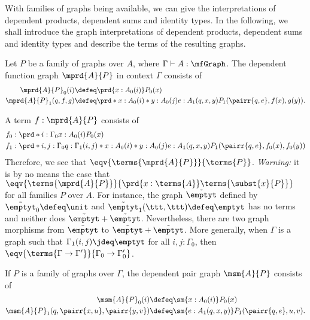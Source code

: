 With families of graphs being available, we can give the interpretations of
dependent products, dependent sums and identity types. In the following, we
shall introduce the graph interpretations of dependent products, dependent
sums and identity types and describe the terms of the resulting graphs.

\begin{defn}
Let $P$ be a family of graphs over $A$, where $\Gamma\vdash A:\mfGraph$. 
The dependent function graph $\mprd{A}{P}$ in context $\Gamma$ consists of
\begin{align*}
\mprd{A}{P}_0(i) & \defeq \prd{x:A_0(i)}P_0(x)\\
\mprd{A}{P}_1(q,f,g) & \defeq \prd*{x:A_0(i)}*{y:A_0(j)}{e:A_1(q,x,y)}P_1(\pairr{q,e},f(x),g(y)).
\end{align*}
\end{defn}

\begin{rmk}
A term $f:\mprd{A}{P}$ consists of
\begin{align*}
f_0 & : \prd*{i:\Gamma_0}{x:A_0(i)}P_0(x)\\
f_1 & : \prd*{i,j:\Gamma_0}{q:\Gamma_1(i,j)}*{x:A_0(i)}*{y:A_0(j)}{e:A_1(q,x,y)}P_1(\pairr{q,e},f_0(x),f_0(y))
\end{align*}
Therefore, we see that $\eqv{\terms{\mprd{A}{P}}}{\terms{P}}$. \emph{Warning:} it
is by no means the case that $\eqv{\terms{\mprd{A}{P}}}{\prd{x:\terms{A}}
\terms{\subst{x}{P}}}$ for all families $P$ over $A$. For instance, the graph
$\tilde{\emptyt}$ defined by $\tilde{\emptyt}_0\defeq\unit$ and 
$\tilde{\emptyt}_1(\ttt,\ttt)\defeq\emptyt$ has no terms and neither does
$\tilde{\emptyt}+\tilde{\emptyt}$. Nevertheless, there are two graph morphisms
from $\tilde{\emptyt}$ to $\tilde{\emptyt}+\tilde{\emptyt}$. More generally,
when $\Gamma$ is a graph such that $\Gamma_1(i,j)\jdeq\emptyt$ for all $i,j:\Gamma_0$,
then $\eqv{{\terms{\Gamma\to\Gamma'}}}{\Gamma_0\to\Gamma^\prime_0}$.
\end{rmk}

\begin{defn}
If $P$ is a family of graphs over $\Gamma$, the dependent pair graph
$\msm{A}{P}$ consists of
\begin{align*}
\msm{A}{P}_0(i) & \defeq \sm{x:A_0(i)}P_0(x)\\
\msm{A}{P}_1(q,\pairr{x,u},\pairr{y,v}) & \defeq \sm{e:A_1(q,x,y)}P_1(\pairr{q,e},u,v).
\end{align*}
\end{defn}

